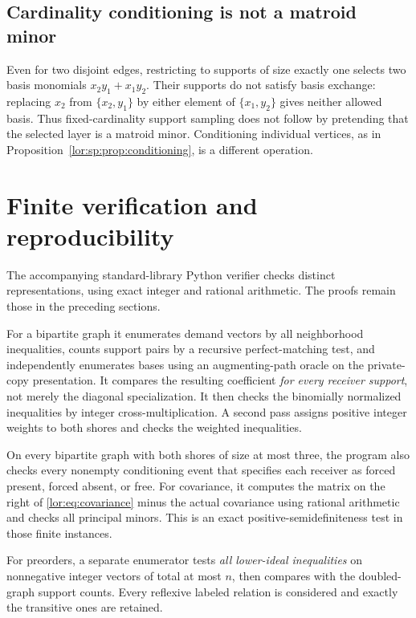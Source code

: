 \documentclass[11pt]{article}
\numberwithin{equation}{section}
\theoremstyle{definition}
\begin{document}
\subsection{Cardinality conditioning is not a matroid minor}
\label{lor:sp:ex:layer}
Even for two disjoint edges, restricting to supports of size exactly one
selects two basis monomials
$x_2y_1+x_1y_2$. Their supports do not satisfy basis exchange: replacing
$x_2$ from $\{x_2,y_1\}$ by either element of $\{x_1,y_2\}$ gives neither
allowed basis. Thus fixed-cardinality support sampling does not follow by
pretending that the selected layer is a matroid minor. Conditioning individual
vertices, as in Proposition~\ref{lor:sp:prop:conditioning}, is a different operation.

\section{Finite verification and reproducibility}
\label{lor:sec:verification}
The accompanying standard-library Python verifier checks distinct
representations, using exact integer and rational arithmetic. The proofs
remain those in the preceding sections.

For a bipartite graph it enumerates demand vectors by all neighborhood
inequalities, counts support pairs by a recursive perfect-matching test,
and independently enumerates bases using an augmenting-path oracle on
the private-copy presentation. It compares the resulting coefficient
\emph{for every receiver support}, not merely the diagonal specialization.
It then checks the binomially normalized inequalities by integer
cross-multiplication. A second pass assigns positive integer weights to
both shores and checks the weighted inequalities.

On every bipartite graph with both shores of size at most three, the
program also checks every nonempty conditioning event that specifies each
receiver as forced present, forced absent, or free. For covariance, it
computes the matrix on the right of \eqref{lor:eq:covariance} minus the actual
covariance using rational arithmetic and checks all principal minors.
This is an exact positive-semidefiniteness test in those finite instances.

For preorders, a separate enumerator tests \emph{all lower-ideal
inequalities} on nonnegative integer vectors of total at most $n$, then
compares with the doubled-graph support counts. Every reflexive labeled
relation is considered and exactly the transitive ones are retained.
\end{document}
